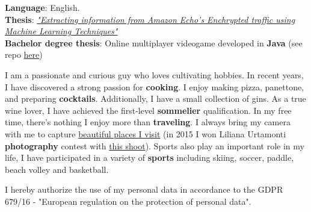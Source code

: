 

\textbf{Language}: English.\\
\textbf{Thesis}: \textit{\href{https://www.politesi.polimi.it/handle/10589/204539}{"Extracting information from Amazon Echo's Enchrypted traffic using Machine Learning Techniques"}}\\
\textbf{Bachelor degree thesis}: Online multiplayer videogame developed in \textbf{Java} (see repo \href{https://github.com/lentinip/ing-sw-2019-Lentini-Marazzi-Marini}{here})






I am a passionate and curious guy who loves cultivating hobbies. In recent years, I have discovered a strong passion for \textbf{cooking}. I enjoy making pizza, panettone, and preparing \textbf{cocktails}. Additionally, I have a small collection of gins. As a true wine lover, I have achieved the first-level \textbf{sommelier} qualification. In my free time, there's nothing I enjoy more than \textbf{traveling}. I always bring my camera with me to capture \href{https://mmarini.it/gallery}{beautiful places I visit} (in 2015 I won Liliana Urtamonti \textbf{photography} contest with \href{https://www.instagram.com/p/1Ql0DrivyoekSE2An1JIdCRMaRkLcDW62WAho0/}{this shoot}). Sports also play an important role in my life, I have participated in a variety of \textbf{sports} including skiing, soccer, paddle, beach volley and basketball.

\divider

\footnotesize{I hereby authorize the use of my personal data in accordance to the GDPR 679/16 - "European regulation on the protection of personal data".}

